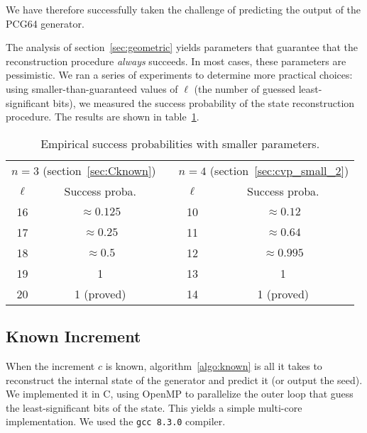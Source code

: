 \documentclass[submission,svgnames,journal=tosc]{iacrtrans}
\begin{document}
We have therefore successfully taken the challenge of predicting the output of
the \textsf{PCG64} generator.

The analysis of section~\ref{sec:geometric} yields parameters that guarantee
that the reconstruction procedure \emph{always} succeeds. In most cases, these
parameters are pessimistic. We ran a series of experiments to determine more
practical choices: using smaller-than-guaranteed values of $\ell$ (the number of
guessed least-significant bits), we measured the success probability of the
state reconstruction procedure. The results are shown in table~\ref{tab:empirical}.

\begin{table}
  \centering
\begin{tabular}{|c|c|c|c|c|}
  \cline{1-2}\cline{4-5}
  \multicolumn{2}{|c|}{$n=3$ (section~\ref{sec:Cknown})} & &  \multicolumn{2}{c|}{$n=4$ (section~\ref{sec:cvp_small_2})} \\
  \cline{1-2}\cline{4-5}
  $\ell$ & Success proba. && $\ell$ & Success proba. \\
  \cline{1-2}\cline{4-5}
  \noalign{\vskip\doublerulesep
  \vskip-\arrayrulewidth}
  \cline{1-2}\cline{4-5}
  16 & $\approx 0.125$     && 10 &  $\approx 0.12$ \\
  \cline{1-2}\cline{4-5}
  17 & $\approx 0.25$     && 11 &  $\approx 0.64$ \\
  \cline{1-2}\cline{4-5}
  18 & $\approx 0.5$      && 12 &  $\approx 0.995$ \\
  \cline{1-2}\cline{4-5}
  19 & 1                  && 13 &  1 \\
  \cline{1-2}\cline{4-5}
  20 & 1 (proved)         && 14 &  1 (proved) \\
  \cline{1-2}\cline{4-5}
\end{tabular}
\caption{Empirical success probabilities with smaller parameters.}
\label{tab:empirical}
\end{table}

\subsection{Known Increment}

When the increment $c$ is known, algorithm~\ref{algo:known} is all it takes to
reconstruct the internal state of the generator and predict it (or output the
seed). We implemented it in \textsf{C}, using \textsf{OpenMP} to parallelize the
outer loop that guess the least-significant bits of the state. This yields a
simple multi-core implementation. We used the \texttt{gcc 8.3.0} compiler.
\end{document}
